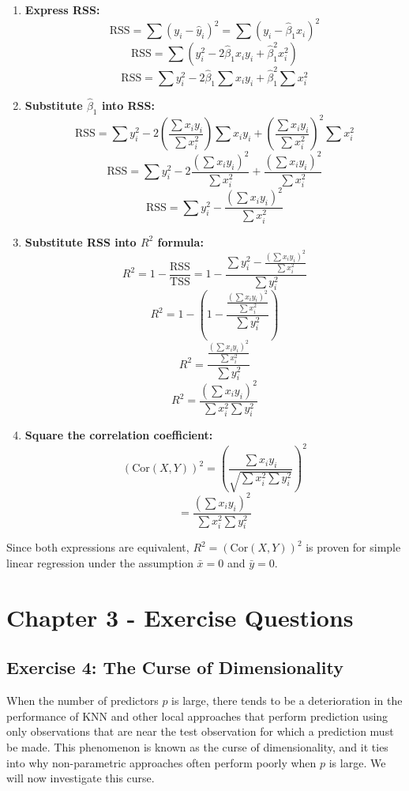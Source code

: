 \documentclass[
]{article}
\begin{document}
\begin{enumerate}
\def\labelenumi{\arabic{enumi}.}
\item
  \textbf{Express RSS:}
  \[\text{RSS} = \sum (y_i - \hat{y}_i)^2 = \sum (y_i - \hat{\beta}_1 x_i)^2\]
  \[\text{RSS} = \sum (y_i^2 - 2 \hat{\beta}_1 x_i y_i + \hat{\beta}_1^2 x_i^2)\]
  \[\text{RSS} = \sum y_i^2 - 2 \hat{\beta}_1 \sum x_i y_i + \hat{\beta}_1^2 \sum x_i^2\]
\item
  \textbf{Substitute \(\hat{\beta}_1\) into RSS:}
  \[\text{RSS} = \sum y_i^2 - 2 \left(\frac{\sum x_i y_i}{\sum x_i^2}\right) \sum x_i y_i + \left(\frac{\sum x_i y_i}{\sum x_i^2}\right)^2 \sum x_i^2\]
  \[\text{RSS} = \sum y_i^2 - 2 \frac{(\sum x_i y_i)^2}{\sum x_i^2} + \frac{(\sum x_i y_i)^2}{\sum x_i^2}\]
  \[\text{RSS} = \sum y_i^2 - \frac{(\sum x_i y_i)^2}{\sum x_i^2}\]
\item
  \textbf{Substitute RSS into \(R^2\) formula:}
  \[R^2 = 1 - \frac{\text{RSS}}{\text{TSS}} = 1 - \frac{\sum y_i^2 - \frac{(\sum x_i y_i)^2}{\sum x_i^2}}{\sum y_i^2}\]
  \[R^2 = 1 - \left(1 - \frac{\frac{(\sum x_i y_i)^2}{\sum x_i^2}}{\sum y_i^2}\right)\]
  \[R^2 = \frac{\frac{(\sum x_i y_i)^2}{\sum x_i^2}}{\sum y_i^2}\]
  \[R^2 = \frac{(\sum x_i y_i)^2}{\sum x_i^2 \sum y_i^2}\]
\item
  \textbf{Square the correlation coefficient:}
  \[(\text{Cor}(X,Y))^2 = \left(\frac{\sum x_i y_i}{\sqrt{\sum x_i^2 \sum y_i^2}}\right)^2\]
  \[= \frac{(\sum x_i y_i)^2}{\sum x_i^2 \sum y_i^2}\]
\end{enumerate}

Since both expressions are equivalent, \(R^2 = (\text{Cor}(X, Y))^2\) is
proven for simple linear regression under the assumption \(\bar{x} = 0\)
and \(\bar{y} = 0\).

\section{Chapter 3 - Exercise
Questions}\label{chapter-3---exercise-questions}

\subsection{Exercise 4: The Curse of
Dimensionality}\label{exercise-4-the-curse-of-dimensionality}

When the number of predictors \(p\) is large, there tends to be a
deterioration in the performance of KNN and other local approaches that
perform prediction using only observations that are near the test
observation for which a prediction must be made. This phenomenon is
known as the curse of dimensionality, and it ties into why
non-parametric approaches often perform poorly when \(p\) is large. We
will now investigate this curse.
\end{document}
